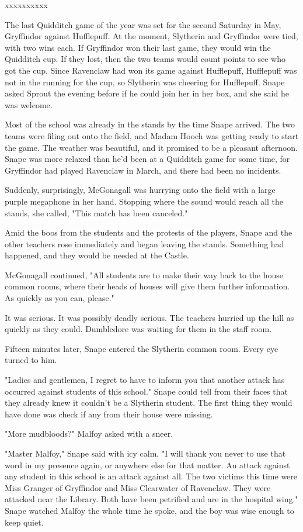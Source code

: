 \documentclass[a4paper,11pt]{article}
\begin{document}
xxxxxxxxxx

The last Quidditch game of the year was set for the second Saturday in May, Gryffindor against Hufflepuff. At the moment, Slytherin and Gryffindor were tied, with two wins each. If Gryffindor won their last game, they would win the Quidditch cup. If they lost, then the two teams would count points to see who got the cup. Since Ravenclaw had won its game against Hufflepuff, Hufflepuff was not in the running for the cup, so Slytherin was cheering for Hufflepuff. Snape asked Sprout the evening before if he could join her in her box, and she said he was welcome.

Most of the school was already in the stands by the time Snape arrived. The two teams were filing out onto the field, and Madam Hooch was getting ready to start the game. The weather was beautiful, and it promised to be a pleasant afternoon. Snape was more relaxed than he'd been at a Quidditch game for some time, for Gryffindor had played Ravenclaw in March, and there had been no incidents.

Suddenly, surprisingly, McGonagall was hurrying onto the field with a large purple megaphone in her hand. Stopping where the sound would reach all the stands, she called, "This match has been canceled."

Amid the boos from the students and the protests of the players, Snape and the other teachers rose immediately and began leaving the stands. Something had happened, and they would be needed at the Castle.

McGonagall continued, "All students are to make their way back to the house common rooms, where their heads of houses will give them further information. As quickly as you can, please."

It was serious. It was possibly deadly serious. The teachers hurried up the hill as quickly as they could. Dumbledore was waiting for them in the staff room.

Fifteen minutes later, Snape entered the Slytherin common room. Every eye turned to him.

"Ladies and gentlemen, I regret to have to inform you that another attack has occurred against students of this school." Snape could tell from their faces that they already knew it couldn't be a Slytherin student. The first thing they would have done was check if any from their house were missing.

"More mudbloods?" Malfoy asked with a sneer.

"Master Malfoy," Snape said with icy calm, "I will thank you never to use that word in my presence again, or anywhere else for that matter. An attack against any student in this school is an attack against all. The two victims this time were Miss Granger of Gryffindor and Miss Clearwater of Ravenclaw. They were attacked near the Library. Both have been petrified and are in the hospital wing." Snape watched Malfoy the whole time he spoke, and the boy was wise enough to keep quiet.
\end{document}
